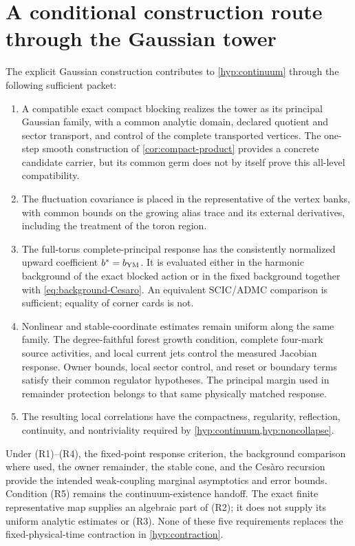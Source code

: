 \documentclass[11pt,oneside,openany]{book}
\theoremstyle{definition}
\theoremstyle{remark}
\begin{document}
\section{A conditional construction route through the Gaussian tower}
The explicit Gaussian construction contributes to
\cref{hyp:continuum} through the following sufficient packet:
\begin{enumerate}[label=\textup{(R\arabic*)},leftmargin=3em]
\item A compatible exact compact blocking realizes the tower as its
principal Gaussian family, with a common analytic domain, declared
quotient and sector transport, and control of the complete transported
vertices. The one-step smooth construction of \cref{cor:compact-product}
provides a concrete candidate carrier, but its common germ does not by
itself prove this all-level compatibility.
\item The fluctuation covariance is placed in the representative of the
vertex banks, with common bounds on the growing alias trace and its
external derivatives, including the treatment of the toron region.
\item The full-torus complete-principal response has the consistently
normalized upward coefficient $b^*=b_{\rm YM}$. It is evaluated either in
the harmonic background of the exact blocked action or in the fixed
background together with \cref{eq:background-Cesaro}. An equivalent
SCIC/ADMC comparison is sufficient; equality of corner cards is not.
\item Nonlinear and stable-coordinate estimates remain uniform along the
same family. The degree-faithful forest growth condition, complete
four-mark source activities, and local current jets control the measured
Jacobian response. Owner bounds, local sector control, and reset or
boundary terms satisfy their common regulator hypotheses. The principal margin used in remainder protection
belongs to that same physically matched response.
\item The resulting local correlations have the compactness, regularity,
reflection, continuity, and nontriviality required by
\cref{hyp:continuum,hyp:noncollapse}.
\end{enumerate}
Under (R1)--(R4), the fixed-point response criterion, the background
comparison where used, the owner remainder, the stable cone, and the
Ces\`aro recursion provide the intended weak-coupling marginal asymptotics
and error bounds. Condition (R5) remains the continuum-existence handoff.
The exact finite representative map supplies an algebraic part of (R2);
it does not supply its uniform analytic estimates or (R3). None of these
five requirements replaces the fixed-physical-time contraction in
\cref{hyp:contraction}.
\end{document}
